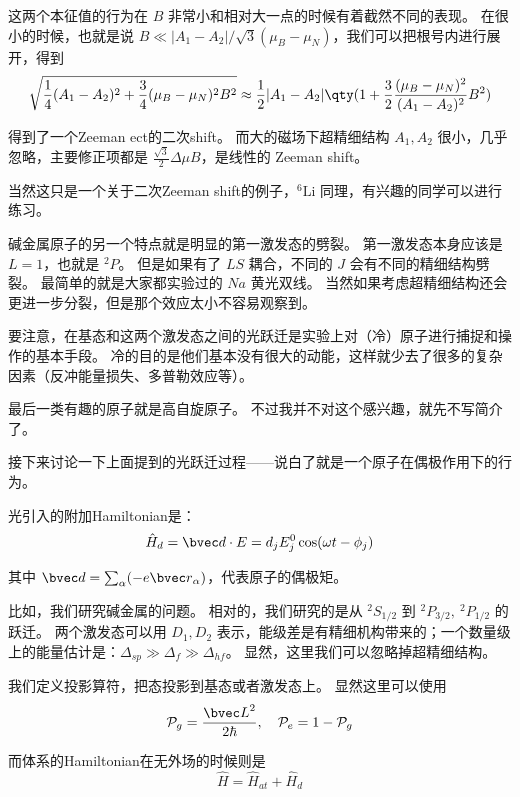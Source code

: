 这两个本征值的行为在 $B$ 非常小和相对大一点的时候有着截然不同的表现。 在很小的时候，也就是说 $B\ll|A_1-A_2| / \sqrt{3}(\mu_B-\mu_N)$，我们可以把根号内进行展开，得到
\begin{equation}
\sqrt{\frac{1}{4}(A_1-A_2)^2+\frac{3}{4}(\mu_B-\mu_N)^2B^2} \approx \frac{1}{2}|A_1-A_2| \qty(1+\frac{3}{2}\frac{(\mu_B-\mu_N)^2}{(A_1-A_2)^2}B^2)
\end{equation}

得到了一个Zeeman ect的二次shift。 而大的磁场下超精细结构 $A_1, A_2$ 很小，几乎忽略，主要修正项都是 $\frac{\sqrt{3}}{2}\Delta\mu B$，是线性的 Zeeman shift。

当然这只是一个关于二次Zeeman shift的例子，$^6{\text{Li}}$ 同理，有兴趣的同学可以进行练习。

碱金属原子的另一个特点就是明显的第一激发态的劈裂。 第一激发态本身应该是 $L=1$，也就是 $^2P$。 但是如果有了 $LS$ 耦合，不同的 $J$ 会有不同的精细结构劈裂。 最简单的就是大家都实验过的 $Na$ 黄光双线。 当然如果考虑超精细结构还会更进一步分裂，但是那个效应太小不容易观察到。

要注意，在基态和这两个激发态之间的光跃迁是实验上对（冷）原子进行捕捉和操作的基本手段。 冷的目的是他们基本没有很大的动能，这样就少去了很多的复杂因素（反冲能量损失、多普勒效应等）。

最后一类有趣的原子就是高自旋原子。 不过我并不对这个感兴趣，就先不写简介了。

接下来讨论一下上面提到的光跃迁过程——说白了就是一个原子在偶极作用下的行为。

光引入的附加Hamiltonian是：
\begin{equation}
\hat{H}_d = {\bvec d\cdot E} = d_j E_j^0 \cos(\omega t-\phi_j)
\end{equation}

其中 ${\bvec d} = \sum_\alpha (-e{\bvec r}_\alpha)$，代表原子的偶极矩。

比如，我们研究碱金属的问题。 相对的，我们研究的是从 $^2S_{1/2}$ 到 $^2P_{3/2},\ ^2P_{1/2}$ 的跃迁。 两个激发态可以用 $D_1,D_2$ 表示，能级差是有精细机构带来的；一个数量级上的能量估计是：$\Delta_{sp} \gg \Delta_f \gg \Delta_{hf}$。 显然，这里我们可以忽略掉超精细结构。

我们定义投影算符，把态投影到基态或者激发态上。 显然这里可以使用
\begin{equation}
\mathcal{P}_g = \frac{{\bvec L}^2}{2\hbar},\quad \mathcal{P}_e = 1 - \mathcal{P}_g
\end{equation}

而体系的Hamiltonian在无外场的时候则是
\begin{equation}
\hat{H} = \hat{H}_{at}+\hat{H}_d
\end{equation}


